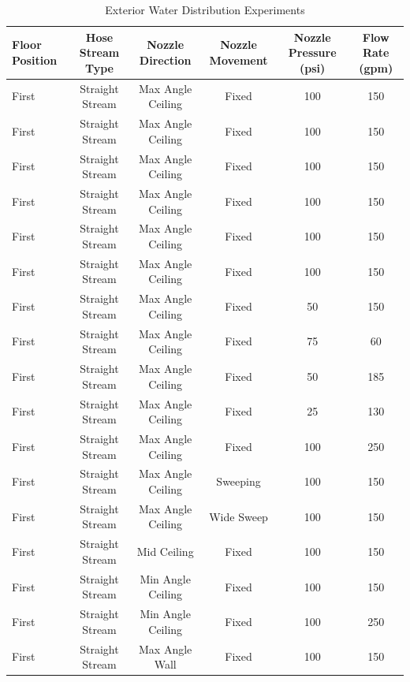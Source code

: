 \documentclass{article}
\begin{document}
\clearpage

\begin{table}[!ht]
\centering
\scriptsize
\caption{Exterior Water Distribution Experiments}
\label{tab:Exterior_Fire_Attack_Distribution_Experiments}
\begin{tabular}{lccccc}
\toprule[1.5pt]
Floor Position & Hose Stream Type & Nozzle Direction & Nozzle Movement & Nozzle Pressure (psi) & Flow Rate (gpm) \\ 
\midrule
First  & Straight Stream  & Max Angle Ceiling      & Fixed              & 100 & 150 \\
First  & Straight Stream  & Max Angle Ceiling      & Fixed              & 100 & 150 \\
First  & Straight Stream  & Max Angle Ceiling      & Fixed              & 100 & 150 \\
First  & Straight Stream  & Max Angle Ceiling      & Fixed              & 100 & 150 \\
First  & Straight Stream  & Max Angle Ceiling      & Fixed              & 100 & 150 \\
First  & Straight Stream  & Max Angle Ceiling      & Fixed              & 100 & 150 \\
First  & Straight Stream  & Max Angle Ceiling      & Fixed              & 50 & 150 \\
First  & Straight Stream  & Max Angle Ceiling      & Fixed              & 75 & 60 \\
First  & Straight Stream  & Max Angle Ceiling      & Fixed              & 50 & 185 \\
First  & Straight Stream  & Max Angle Ceiling      & Fixed              & 25 & 130 \\
First  & Straight Stream  & Max Angle Ceiling      & Fixed              & 100 & 250 \\
First  & Straight Stream  & Max Angle Ceiling      & Sweeping           & 100 & 150 \\
First  & Straight Stream  & Max Angle Ceiling      & Wide Sweep         & 100 & 150 \\
First  & Straight Stream    & Mid Ceiling          & Fixed      		& 100 & 150 \\
First  & Straight Stream    & Min Angle Ceiling    & Fixed     		    & 100 & 150 \\
First  & Straight Stream    & Min Angle Ceiling    & Fixed      		& 100 & 250 \\
First  & Straight Stream    & Max Angle Wall       & Fixed     		    & 100 & 150 \\

\end{tabular}
\end{table}
\end{document}
